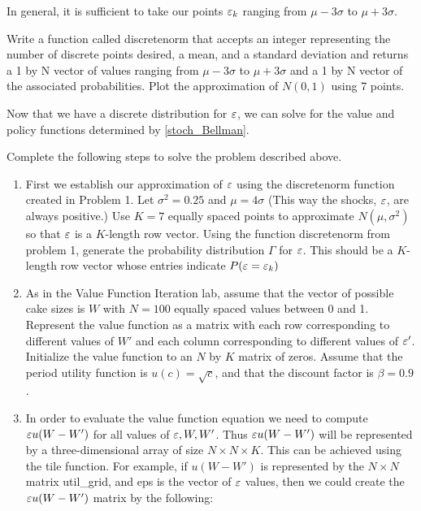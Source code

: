 In general, it is sufficient to take our points $\varepsilon_k$ ranging from $\mu - 3\sigma$ to $\mu + 3\sigma$.

\begin{problem}
Write a function called discretenorm that accepts an integer representing the number of discrete points desired, a mean, and a standard deviation and returns a 1 by N vector of values ranging from $\mu - 3\sigma$ to $\mu + 3\sigma$  and a 1 by N vector of the associated probabilities.  Plot the approximation of $N(0,1)$ using 7 points.
\end{problem}

Now that we have a discrete distribution for $\varepsilon$, we can solve for the value and policy functions determined by \eqref{stoch_Bellman}.

\begin{problem}
Complete the following steps to solve the problem described above.
\begin{enumerate}
   \item First we establish our approximation of $\varepsilon$ using the discretenorm function created in Problem 1. Let $\sigma^2 = 0.25$ and $\mu=4\sigma$ (This way the shocks, $\varepsilon$, are always positive.) Use $K=7$ equally spaced points to approximate $N(\mu,\sigma^2)$ so that $\varepsilon$ is a $K$-length row vector.  Using the function discretenorm from problem 1, generate the probability distribution $\Gamma$ for $\varepsilon$. This should be a $K$-length row vector whose entries indicate $P(\varepsilon = \varepsilon_k)$

   \item As in the Value Function Iteration lab, assume that the vector of possible cake sizes is $W$ with $N=100$ equally spaced values between 0 and 1.  Represent the value function as a matrix with each row corresponding to different values of $W'$ and each column corresponding to different values of $\varepsilon'$. Initialize the value function to an $N$ by $K$ matrix of zeros.  Assume that the period utility function is $u(c)=\sqrt{c}$, and that the discount factor is $\beta = 0.9$.


   \item In order to evaluate the value function equation we need to compute $\varepsilon u(W-W')$ for all values of $\varepsilon,W,W'$.  Thus $\varepsilon u(W-W')$ will be represented by a three-dimensional array of size $N\times N\times K$.  This can be achieved using the tile function.  For example, if $u(W-W')$ is represented by the $N\times N$ matrix util\_grid, and eps is the vector of $\varepsilon$ values, then we could create the $\varepsilon u(W-W')$ matrix by the following:
       

\end{enumerate}
\end{problem}
